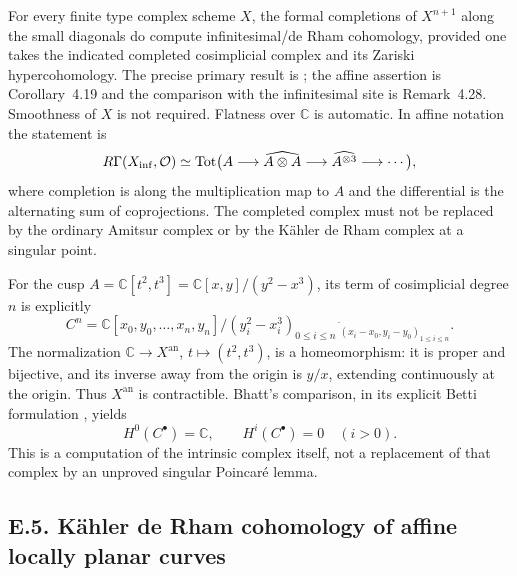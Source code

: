 For every finite type complex scheme $X$, the formal completions of $X^{n+1}$ along the small diagonals do compute infinitesimal/de Rham cohomology, provided one takes the indicated completed cosimplicial complex and its Zariski hypercohomology.  The precise primary result is \cite[Corollary~4.30]{Bhatt2012}; the affine assertion is Corollary~4.19 and the comparison with the infinitesimal site is Remark~4.28.  Smoothness of $X$ is not required.  Flatness over $\mathbb C$ is automatic.  In affine notation the statement is
\[
 R\Gamma(X_{\mathrm{inf}},\mathcal O)\simeq
 \operatorname{Tot}\bigl(A\longrightarrow\widehat{A\otimes A}
     \longrightarrow\widehat{A^{\otimes3}}\longrightarrow\cdots\bigr),
\]
where completion is along the multiplication map to $A$ and the differential is the alternating sum of coprojections.  The completed complex must not be replaced by the ordinary Amitsur complex or by the K\"ahler de Rham complex at a singular point.

For the cusp $A=\mathbb C[t^2,t^3]=\mathbb C[x,y]/(y^2-x^3)$, its term of cosimplicial degree $n$ is explicitly
\[
 C^n=\mathbb C[x_0,y_0,\ldots,x_n,y_n]/(y_i^2-x_i^3)_{0\leq i\leq n}
       \ {}^{\widehat{\ }}_{(x_i-x_0,y_i-y_0)_{1\leq i\leq n}}.
\]
The normalization $\mathbb C\to X^{\mathrm{an}}$, $t\mapsto(t^2,t^3)$, is a homeomorphism: it is proper and bijective, and its inverse away from the origin is $y/x$, extending continuously at the origin.  Thus $X^{\mathrm{an}}$ is contractible.  Bhatt's comparison, in its explicit Betti formulation \cite[Example~4.23]{Bhatt2012}, yields
\[
 H^0(C^\bullet)=\mathbb C,\qquad H^i(C^\bullet)=0\quad(i>0).
\]
This is a computation of the intrinsic complex itself, not a replacement of that complex by an unproved singular Poincar\'e lemma.

\subsection{E.5. K\"ahler de Rham cohomology of affine locally planar curves}

